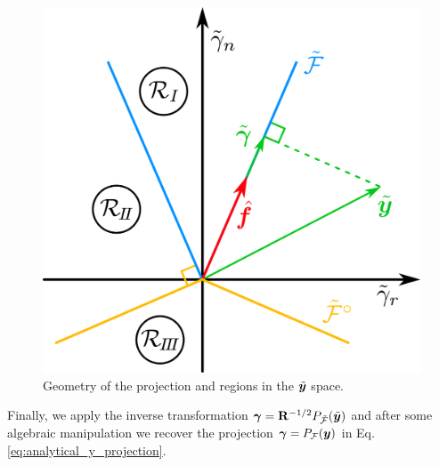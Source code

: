 \begin{figure}[!h]
    \centering
    \includegraphics[width=0.6\columnwidth]{figures/schematics/analytical_inverse_dynamics.png}
    \caption{Geometry of the projection and regions in the
    $\tilde{{\bm{y}}}$ space.}
    \label{fig:cone_regions}
\end{figure}

Finally, we apply the inverse transformation
${\bm\gamma}={\mathbf{R}}^{-1/2}P_{\tilde{\mathcal{F}}}(\tilde{{\bm{y}}})$ and after some
algebraic manipulation we recover the projection ${\bm\gamma} =
P_\mathcal{F}({\bm{y}})$ in Eq. \eqref{eq:analytical_y_projection}.


